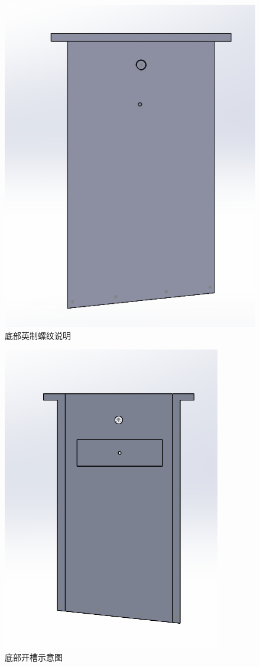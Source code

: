 \documentclass{MyLatex}
\begin{document}
\begin{figure}[H]
\centering
\includegraphics[width=0.8\linewidth]{./image/Zpicture/1_3底部英制螺纹孔.png}
\caption{底部英制螺纹说明} \label{fig:底英制螺纹}
\end{figure}

\begin{figure}[H]
\centering
\includegraphics[width=0.8\linewidth]{./image/Zpicture/1_3底部开槽.png}
\caption{底部开槽示意图} \label{fig:底部槽}
\end{figure}
\end{document}

